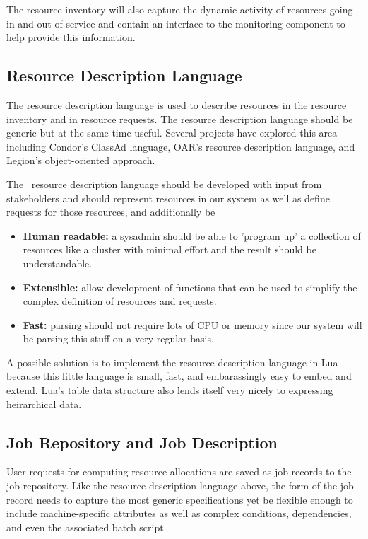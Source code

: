 The resource inventory will also capture the dynamic activity of
resources going in and out of service and contain an interface to the
monitoring component to help provide this information.

\subsection{Resource Description Language}

The resource description language is used to describe resources
in the resource inventory and in resource requests.
The resource description language should be generic but at the same
time useful.  Several projects have explored this area including
Condor's ClassAd language\cite{ClassAd},
OAR's resource description language\cite{Oar},
and Legion's\cite{LegionGrid}\cite{LegionRM} object-oriented approach.

The \ngrm\ resource description language should be developed with
input from stakeholders and should represent resources in our system as
well as define requests for those resources, and additionally be
\begin{itemize}
\item{\textbf{Human readable:} a sysadmin should be able to 'program up'
a collection of resources like a cluster with minimal
effort and the result should be understandable.}
\item{\textbf{Extensible:} allow development of functions that can be used
to simplify the complex definition of resources and requests.}
\item{\textbf{Fast:} parsing should not require lots of CPU or memory since
our system will be parsing this stuff on a very regular basis.}
\end{itemize}

A possible solution is to implement the
resource description language in Lua\cite{Lua} because this
little language is small, fast, and embarassingly easy to embed and
extend.  Lua's table data structure also lends itself very nicely to
expressing heirarchical data.

\subsection{Job Repository and Job Description}

User requests for computing resource allocations are saved as job
records to the job repository.  Like the resource description language
above, the form of the job record needs to capture the most generic
specifications yet be flexible enough to include machine-specific
attributes as well as complex conditions, dependencies, and even the
associated batch script.

